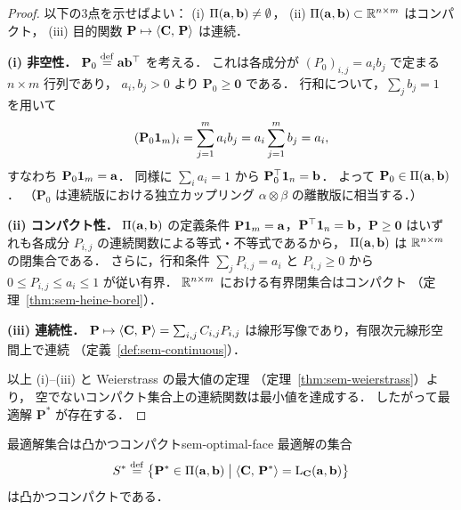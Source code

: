 \begin{proof}
  以下の3点を示せばよい：
  (i) $\Pi(\mathbf{a}, \mathbf{b}) \neq \emptyset$，
  (ii) $\Pi(\mathbf{a}, \mathbf{b}) \subset \mathbb{R}^{n \times m}$ はコンパクト，
  (iii) 目的関数 $\mathbf{P} \mapsto \langle \mathbf{C},\, \mathbf{P} \rangle$ は連続．

  \textbf{(i) 非空性．}
  $\mathbf{P}_0 \overset{\mathrm{def}}{=} \mathbf{a}\mathbf{b}^\top$ を考える．
  これは各成分が $(P_0)_{i,j} = a_i b_j$ で定まる $n \times m$ 行列であり，
  $a_i, b_j > 0$ より $\mathbf{P}_0 \geq \mathbf{0}$ である．
  行和について，$\sum_j b_j = 1$ を用いて
  \[
    (\mathbf{P}_0 \mathbf{1}_m)_i
    = \sum_{j=1}^m a_i b_j
    = a_i \sum_{j=1}^m b_j
    = a_i,
  \]
  すなわち $\mathbf{P}_0 \mathbf{1}_m = \mathbf{a}$．
  同様に $\sum_i a_i = 1$ から $\mathbf{P}_0^\top \mathbf{1}_n = \mathbf{b}$．
  よって $\mathbf{P}_0 \in \Pi(\mathbf{a}, \mathbf{b})$．
  （$\mathbf{P}_0$ は連続版における独立カップリング $\alpha \otimes \beta$
  の離散版に相当する．）

  \textbf{(ii) コンパクト性．}
  $\Pi(\mathbf{a}, \mathbf{b})$ の定義条件
  $\mathbf{P}\mathbf{1}_m = \mathbf{a}$，$\mathbf{P}^\top \mathbf{1}_n = \mathbf{b}$，$\mathbf{P} \geq \mathbf{0}$
  はいずれも各成分 $P_{i,j}$ の連続関数による等式・不等式であるから，
  $\Pi(\mathbf{a}, \mathbf{b})$ は $\mathbb{R}^{n \times m}$ の閉集合である．
  さらに，行和条件 $\sum_j P_{i,j} = a_i$ と $P_{i,j} \geq 0$ から
  $0 \leq P_{i,j} \leq a_i \leq 1$ が従い有界．
  $\mathbb{R}^{n \times m}$ における有界閉集合はコンパクト
  （定理~\ref{thm:sem-heine-borel}）．

  \textbf{(iii) 連続性．}
  $\mathbf{P} \mapsto \langle \mathbf{C},\, \mathbf{P} \rangle = \sum_{i,j} C_{i,j} P_{i,j}$
  は線形写像であり，有限次元線形空間上で連続
  （定義~\ref{def:sem-continuous}）．

  以上 (i)--(iii) と Weierstrass の最大値の定理
  （定理~\ref{thm:sem-weierstrass}）より，
  空でないコンパクト集合上の連続関数は最小値を達成する．
  したがって最適解 $\mathbf{P}^*$ が存在する．
\end{proof}

\begin{claim}{最適解集合は凸かつコンパクト}{sem-optimal-face}
  最適解の集合
  \[
    S^*
    \overset{\mathrm{def}}{=}
    \bigl\{ \mathbf{P}^* \in \Pi(\mathbf{a}, \mathbf{b})
    \bigm|
    \langle \mathbf{C},\, \mathbf{P}^* \rangle = \mathrm{L}_{\mathbf{C}}(\mathbf{a}, \mathbf{b})
    \bigr\}
  \]
  は凸かつコンパクトである．
\end{claim}

